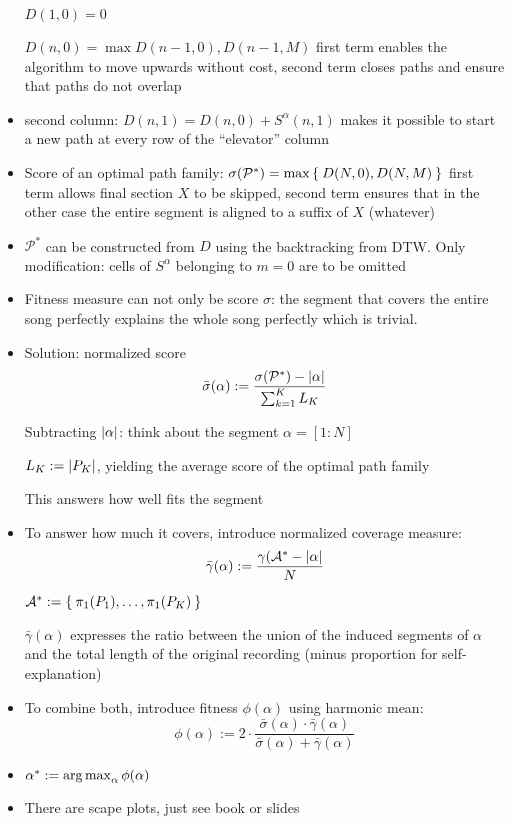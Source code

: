 \begin{itemize}
		$D(1,0) = 0$

		$D(n,0) = \max{D(n-1,0), D(n-1, M)}$ first term enables the algorithm to move upwards without cost, second term closes paths and ensure that paths do not overlap
	\item
		second column: $D(n,1) = D(n,0) + S^\alpha(n,1)$ makes it possible to start a new path at every row of the \enquote{elevator} column
	\item
		Score of an optimal path family: $\sigma(\mathcal{P}^*) = \max \Set{D(N,0), D(N,M)}$ first term allows final section $X$ to be skipped, second term ensures that in the other case the entire segment is aligned to a suffix of $X$ (whatever)
	\item
		$\mathcal{P}^*$ can be constructed from $D$ using the backtracking from DTW. Only modification: cells of $S^\alpha$ belonging to $m=0$ are to be omitted
	\item
		Fitness measure can not only be score $\sigma$: the segment that covers the entire song perfectly explains the whole song perfectly which is trivial.
	\item
		Solution: normalized score 
		$$\bar\sigma(\alpha) := \frac{\sigma(\mathcal{P}^*) - \lvert\alpha\rvert}{\sum_{k=1}^K L_K}$$

		Subtracting $\lvert\alpha\rvert$: think about the segment $\alpha = [1:N]$

		$L_K := \lvert P_K\rvert$, yielding the average score of the optimal path family

		This answers how well fits the segment
	\item
		To answer how much it covers, introduce normalized coverage measure:
		$$
		\bar\gamma(\alpha) := \frac{\gamma(\mathcal{A}^* - \lvert\alpha\rvert}{N}$$

		$\mathcal{A}^* := \Set{\pi_1(P_1), \dots, \pi_1(P_K)}$

		$\bar\gamma(\alpha)$ expresses the ratio between the union of the induced segments of $\alpha$ and the total length of the original recording (minus proportion for self-explanation)

	\item
		To combine both, introduce fitness $\phi(\alpha)$ using harmonic mean:
		$$ \phi(\alpha) := 2 \cdot \frac{\bar\sigma(\alpha) \cdot \bar\gamma(\alpha)}{\bar\sigma(\alpha) + \bar\gamma(\alpha)}$$

	\item
		$\alpha^* := \operatorname*{arg\,max}_\alpha \phi(\alpha)$

	\item
		There are scape plots, just see book or slides
\end{itemize}



